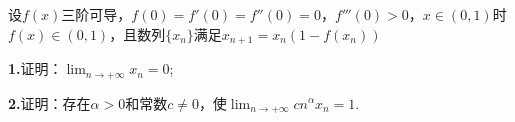 \documentclass[UTF8,14pt,normal]{ctexart}
\begin{document}
    设$f(x)$三阶可导，$f(0)=f'(0)=f''(0)=0$，$f'''(0)>0$，$x\in(0,1)$时$f(x)\in(0,1)$，且数列$\{x_n\}$满足$x_{n+1}=x_n(1-f(x_n))$
    
    \textbf{1.}证明：$\displaystyle\lim_{n\to+\infty}x_n=0$;
    
    \textbf{2.}证明：存在$\alpha >0$和常数$c\neq 0$，使$\displaystyle\lim_{n\to+\infty}cn^\alpha x_n=1$.
    
    
    
\end{document}
